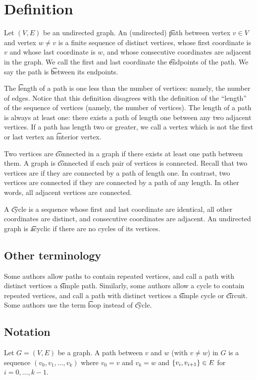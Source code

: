 

\section*{Definition}

Let $(V, E)$ be an undirected graph.
An (undirected) \t{path} between vertex $v \in V$ and vertex $w \neq v$ is a finite sequence of distinct vertices, whose first coordinate is $v$ and whose last coordinate is $w$, and whose consecutive coordinates are adjacent in the graph.
We call the first and last coordinate the \t{endpoints} of the path.
We say the path is \t{between} its endpoints.

The \t{length} of a path is one less than the number of vertices: namely, the number of edges.
Notice that this definition disagrees with the definition of the ``length'' of the sequence of vertices (namely, the number of vertices).
The length of a path is always at least one: there exists a path of length one between any two adjacent vertices.
If a path has length two or greater, we call a vertex which is not the first or last vertex an \t{interior vertex}.

Two vertices are \t{connected} in a graph if there exists at least one path between them.
A graph is \t{connected} if each pair of vertices is connected.
Recall that two vertices are if they are connected by a path of length one.
In contrast, two vertices are connected if they are connected by a path of any length.
In other words, all adjacent vertices are connected.

A \t{cycle} is a sequence whose first and last coordinate are identical, all other coordinates are distinct, and consecutive coordinates are adjacent.
An undirected graph is \t{acyclic} if there are no cycles of its vertices.

\subsection*{Other terminology}

Some authors allow paths to contain repeated vertices, and call a path with distinct vertices a \t{simple path}.
Similarly, some authors allow a cycle to contain repeated vertices, and call a path with distinct vertices a \t{simple cycle} or \t{circuit}.
Some authors use the term \t{loop} instead of \t{cycle}.

\subsection*{Notation}

Let $G = (V, E)$ be a graph.
A path between $v$ and $w$ (with $v \neq w$) in $G$ is a sequence $(v_0, v_1, \dots , v_k)$ where $v_0 = v$ and $v_k = w$ and $\{v_i, v_{i+1}\} \in E$ for $i = 0, \dots , k-1$.
